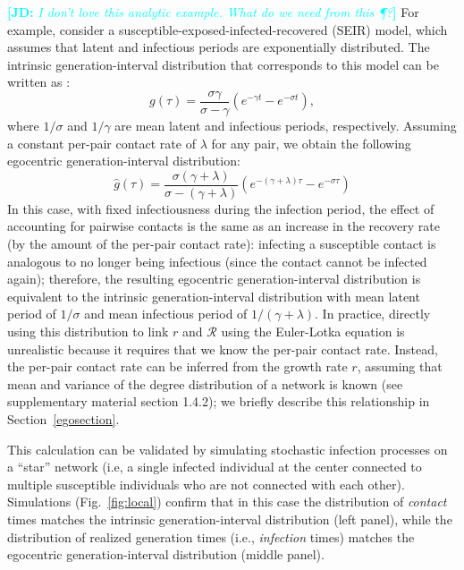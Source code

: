 \documentclass[12pt]{article}
\newcommand{\fref}[1]{Fig.~\ref{fig:#1}}
\newcommand{\RR}{\ensuremath{{\mathcal R}}}
\newcommand{\comment}[3]{\textcolor{#1}{\textbf{[#2: }\textsl{#3}\textbf{]}}}
\newcommand{\jd}[1]{\comment{cyan}{JD}{#1}}
\begin{document}
\jd{I don't love this analytic example. What do we need from this \P?}
For example, consider a susceptible-exposed-infected-recovered (SEIR) model, which assumes that latent and infectious periods are exponentially distributed.
The intrinsic generation-interval distribution that corresponds to this model can be written as \citep{Champredon2018equivalence}:
\begin{equation}
g(\tau) = \frac{\sigma \gamma}{\sigma - \gamma} \left(e^{-\gamma t} - e^{-\sigma t}\right),
\end{equation}
where $1/\sigma$ and $1/\gamma$ are mean latent and infectious periods, respectively.
Assuming a constant per-pair contact rate of $\lambda$ for any pair, we obtain the following egocentric generation-interval distribution:
\begin{equation}
\hat{g}(\tau) = \frac{\sigma (\gamma + \lambda)}{\sigma - (\gamma + \lambda)} \left(e^{-(\gamma + \lambda)\tau} - e^{-\sigma \tau}\right)
\end{equation}
In this case, with fixed infectiousness during the infection period, the effect of accounting for pairwise contacts is the same as an increase in the recovery rate (by the amount of the per-pair contact rate): infecting a susceptible contact is analogous to no longer being infectious (since the contact cannot be infected again); therefore, the resulting egocentric generation-interval distribution is equivalent to the intrinsic generation-interval distribution with mean latent period of $1/\sigma$ and mean infectious period of $1/(\gamma + \lambda)$.
In practice, directly using this distribution to link $r$ and $\RR$ using the Euler-Lotka equation is unrealistic because it requires that we know the per-pair contact rate. 
Instead, the per-pair contact rate can be inferred from the growth rate $r$, assuming that mean and variance of the degree distribution of a network is known (see \cite{trapman2016inferring} supplementary material section 1.4.2);
we briefly describe this relationship in Section~\ref{egosection}.

This calculation can be validated by simulating stochastic infection processes on a ``star'' network (i.e, a single infected individual at the center connected to multiple susceptible individuals who are not connected with each other).
Simulations (\fref{local}) confirm that in this case the distribution of \emph{contact} times matches the intrinsic generation-interval distribution (left panel), while the distribution of realized generation times (i.e., \emph{infection} times) matches the egocentric generation-interval distribution (middle panel).
\end{document}
